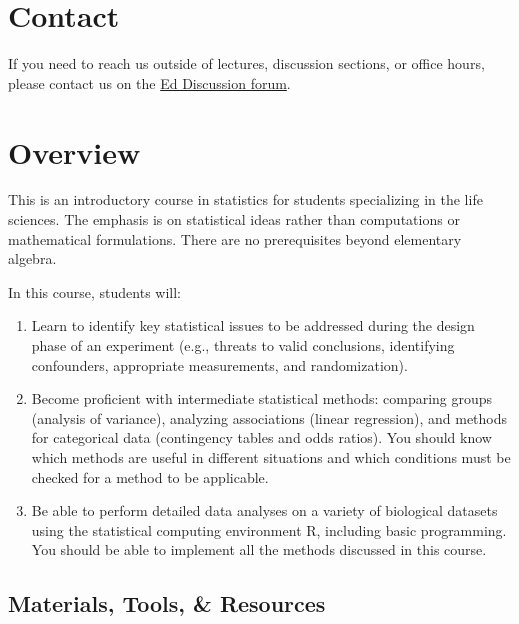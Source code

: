 \documentclass[
  letterpaper,
  DIV=11,
  numbers=noendperiod]{scrreprt}
\begin{document}
\section*{Contact}\label{contact}


If you need to reach us outside of lectures, discussion sections, or
office hours, please contact us on the
\href{https://edstem.org/us/courses/96989/discussion}{Ed Discussion
forum}.

\section*{Overview}\label{overview}


This is an introductory course in statistics for students specializing
in the life sciences. The emphasis is on statistical ideas rather than
computations or mathematical formulations. There are no prerequisites
beyond elementary algebra.

In this course, students will:

\begin{enumerate}
\def\labelenumi{\arabic{enumi}.}
\item
  Learn to identify key statistical issues to be addressed during the
  design phase of an experiment (e.g., threats to valid conclusions,
  identifying confounders, appropriate measurements, and randomization).
\item
  Become proficient with intermediate statistical methods: comparing
  groups (analysis of variance), analyzing associations (linear
  regression), and methods for categorical data (contingency tables and
  odds ratios). You should know which methods are useful in different
  situations and which conditions must be checked for a method to be
  applicable.
\item
  Be able to perform detailed data analyses on a variety of biological
  datasets using the statistical computing environment R, including
  basic programming. You should be able to implement all the methods
  discussed in this course.
\end{enumerate}

\subsection*{Materials, Tools, \&
Resources}\label{materials-tools-resources}
\end{document}
